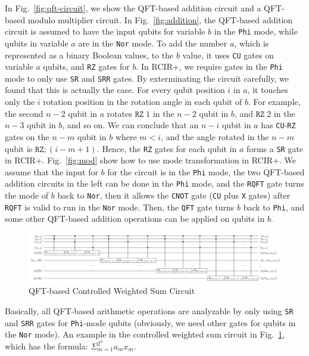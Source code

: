 In Fig.~\ref{fig:qft-circuit}, we show the QFT-based addition circuit and a QFT-based modulo multiplier circuit. 
In Fig.~\ref{fig:addition}, the QFT-based addition circuit is assumed to have the input qubits for variable $b$ in the \texttt{Phi} mode, while qubits in variable $a$ are in the \texttt{Nor} mode.
To add the number $a$, which is represented as a binary Boolean values, to the $b$ value, it uses \texttt{CU} gates on variable $a$ qubits, and \texttt{RZ} gates for $b$. In RCIR+, we require gates in the \texttt{Phi} mode to only use \texttt{SR} and \texttt{SRR} gates. By exterminating the circuit carefully, we found that this is actually the case. For every qubit position $i$ in $a$, it touches only the $i$ rotation position in the rotation angle in each qubit of $b$. For example, the second $n-2$ qubit in $a$ rotates $\texttt{RZ}\;1$ in the $n-2$ qubit in $b$, and $\texttt{RZ}\;2$ in the $n-3$ qubit in $b$, and so on. We can conclude that an $n-i$ qubit in $a$ has \texttt{CU}-\texttt{RZ} gates on the $n-m$ qubit in $b$ where $m<i$, and the angle rotated in the $n-m$ qubit is $\texttt{RZ};(i-m+1)$. Hence, the \texttt{RZ} gates for each qubit in $a$ forms a \texttt{SR} gate in RCIR+. 
Fig.~\ref{fig:mod} show how to use mode transformation in RCIR+. We assume that the input for $b$ for the circuit is in the \texttt{Phi} mode, the two QFT-based addition circuits in the left can be done in the \texttt{Phi} mode, and the \texttt{RQFT} gate turns the mode of $b$ back to \texttt{Nor}, then it allows the \texttt{CNOT} gate (\texttt{CU} plus \texttt{X} gates) after \texttt{RQFT} is valid to run in the \texttt{Nor} mode. Then, the \texttt{QFT} gate turns $b$ back to \texttt{Phi}, and some other QFT-based addition operations can be applied on qubits in $b$. 

\begin{figure}[h]
\centering
         \includegraphics[width=\textwidth]{controlled-weight-sum.png}
\caption{QFT-based Controlled Weighted Sum Circuit}
\label{fig:qft-contol-circuit}
\end{figure}

Basically, all QFT-based arithmetic operations are analyzable by only using \texttt{SR} and \texttt{SRR} gates for \texttt{Phi}-mode qubits (obviously, we need other gates for qubits in the \texttt{Nor} mode). An example in the controlled weighted sum circuit in Fig.~\ref{fig:qft-contol-circuit}, which has the formula: $\Sigma^{2^n}_{m=1}a_m x_m$.

